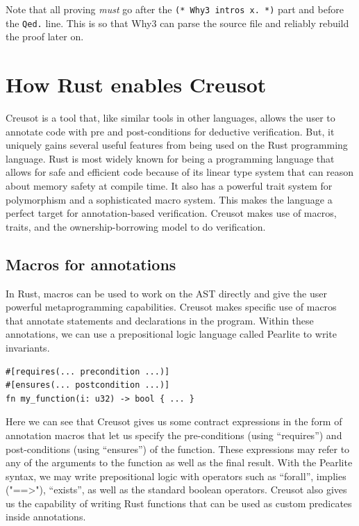 \documentclass[12pt]{article}
\begin{document}
Note that all proving \emph{must} go after the \texttt{(* Why3 intros x. *)} part and before the \texttt{Qed.} line.
This is so that Why3 can parse the source file and reliably rebuild the proof later on.

\section{How Rust enables Creusot}


Creusot is a tool that, like similar tools in other languages, allows the user to annotate code with pre and post-conditions for deductive verification.
But, it uniquely gains several useful features from being used on the Rust programming language.
Rust is most widely known for being a programming language that allows for safe and efficient code because of its linear type system that can reason about memory safety at compile time.
It also has a powerful trait system for polymorphism and a sophisticated macro system.
This makes the language a perfect target for annotation-based verification.
Creusot makes use of macros, traits, and the ownership-borrowing model to do verification.

\subsection{Macros for annotations}
In Rust, macros can be used to work on the AST directly and give the user powerful metaprogramming capabilities.
Creusot makes specific use of macros that annotate statements and declarations in the program.
Within these annotations, we can use a prepositional logic language called Pearlite to write invariants.
\begin{verbatim}
#[requires(... precondition ...)]
#[ensures(... postcondition ...)]
fn my_function(i: u32) -> bool { ... }
\end{verbatim}

Here we can see that Creusot gives us some contract expressions in the form of annotation macros that let us specify the pre-conditions (using ``requires'') and post-conditions (using ``ensures'') of the function.
These expressions may refer to any of the arguments to the function as well as the final result.
With the Pearlite syntax, we may write prepositional logic with operators such as ``forall'', implies ("==>"), ``exists'', as well as the standard boolean operators.
Creusot also gives us the capability of writing Rust functions that can be used as custom predicates inside annotations.
\end{document}

